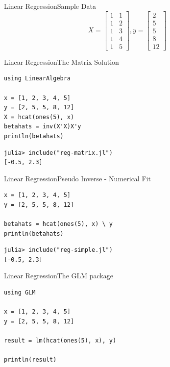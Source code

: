 \documentclass[11pt]{beamer}
\begin{document}
\begin{frame}[fragile]{Linear Regression}{Sample Data}
\begin{equation}
X = \begin{bmatrix}
	1 & 1 \\
	1 & 2 \\
	1 & 3 \\
	1 & 4 \\
	1 & 5 
\end{bmatrix}, y = \begin{bmatrix}
2 \\
5 \\ 
5 \\ 
8 \\ 
12
\end{bmatrix}
\end{equation}
\end{frame}


\begin{frame}[fragile]{Linear Regression}{The Matrix Solution}
\begin{lstlisting}
using LinearAlgebra
		
x = [1, 2, 3, 4, 5]
y = [2, 5, 5, 8, 12]
X = hcat(ones(5), x)
betahats = inv(X'X)X'y
println(betahats)
\end{lstlisting}
	
\begin{lstlisting}
julia> include("reg-matrix.jl")
[-0.5, 2.3]
\end{lstlisting}
\end{frame}


\begin{frame}[fragile]{Linear Regression}{Pseudo Inverse - Numerical Fit}
\begin{lstlisting}
x = [1, 2, 3, 4, 5]
y = [2, 5, 5, 8, 12]

betahats = hcat(ones(5), x) \ y 
println(betahats)	
\end{lstlisting}

\begin{lstlisting}
julia> include("reg-simple.jl")
[-0.5, 2.3]
\end{lstlisting}
\end{frame}


\begin{frame}[fragile]{Linear Regression}{The GLM package}
\begin{lstlisting}
using GLM 

x = [1, 2, 3, 4, 5]
y = [2, 5, 5, 8, 12]

result = lm(hcat(ones(5), x), y)

println(result)

\end{lstlisting}
\end{frame}
\end{document}
